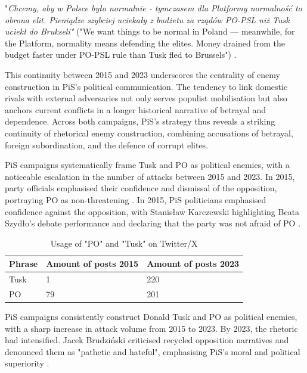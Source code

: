 \begin{displayquote}
    "\textit{Chcemy, aby w Polsce było normalnie - tymczasem dla Platformy normalność to obrona elit. Pieniądze szybciej uciekały z budżetu za rządów PO-PSL niż Tusk uciekł do Brukseli"} ("We want things to be normal in Poland — meanwhile, for the Platform, normality means defending the elites. Money drained from the budget faster under PO-PSL rule than Tusk fled to Brussels") \citep{pisorgpl2023d}.
\end{displayquote}

This continuity between 2015 and 2023 underscores the centrality of enemy construction in PiS's political communication. The tendency to link domestic rivals with external adversaries not only serves populist mobilisation but also anchors current conflicts in a longer historical narrative of betrayal and dependence. Across both campaigns, PiS's strategy thus reveals a striking continuity of rhetorical enemy construction, combining accusations of betrayal, foreign subordination, and the defence of corrupt elites.

PiS campaigns systematically frame Tusk and PO as political enemies, with a noticeable escalation in the number of attacks between 2015 and 2023. In 2015, party officials emphasised their confidence and dismissal of the opposition, portraying PO as non-threatening \citep{pisorgpl2015b}. In 2015, PiS politicians emphasised confidence against the opposition, with Stanisław Karczewski highlighting Beata Szydło's debate performance and declaring that the party was not afraid of PO \citep{pisorgpl2015b}. \\

\vspace{1cm}

\begin{table}[H]
    \centering
    \begin{tabular}{p{4cm}p{4cm}p{4cm}}
        \toprule
        \textbf{Phrase} & \textbf{Amount of posts 2015}  & \textbf{Amount of posts 2023} \\ \midrule
        Tusk & 1 & 220  \\
        PO & 79 & 201  \\ \bottomrule
    \end{tabular}
    \caption{Usage of "PO" and "Tusk" on Twitter/X \citep{rybicki_2025_16933320}}
    \label{tab:phrases-comp-2015-2023}
\end{table}

PiS campaigns consistently construct Donald Tusk and PO as political enemies, with a sharp increase in attack volume from 2015 to 2023. By 2023, the rhetoric had intensified. Jacek Brudziński criticised recycled opposition narratives and denounced them as "pathetic and hateful", emphasising PiS's moral and political superiority \citep{jbrudzinski2023}.

